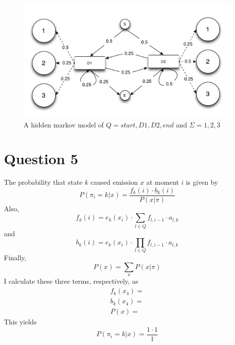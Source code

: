 \documentclass[12pt]{article}
\begin{document}
\begin{figure}[htb]
	\begin{center}
		\includegraphics[width=4.5in]{hmm.jpg}
	\end{center}
	\caption{A hidden markov model of $Q=\textit{start},D1,D2,\textit{end}$ and $\Sigma = 1,2,3$}
	\label{hmm}
\end{figure}

\section*{Question 5}

The probability that state $k$ caused emission $x$ at moment $i$ is given by
\[
	 P(\pi_i = k|x) = \frac{f_{k}(i) \cdot b_k(i)}{P(x|\pi)}
\]
Also,
\[
	f_{k}(i) = e_k(x_i)\cdot \sum_{l\in Q} f_{l,i-1}\cdot a_{l,k} 
\]
and
\[
	b_{k}(i) = e_k(x_i)\cdot \prod_{l\in Q} f_{l,i-1}\cdot a_{l,k}
\]
Finally,
\[
	P(x)=\sum_\pi P(x|\pi)
\]
I calculate these three terms, respectively, as
$$\begin{array}{ccc}
	f_k(x_4)= \\
	b_k(x_4)= \\
	P(x) = 
\end{array}$$
This yields  %
\[
	P(\pi_i = k|x) = \frac{1 \cdot 1}{1}
\]
\end{document}
